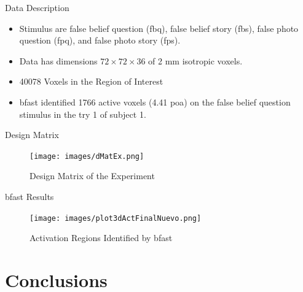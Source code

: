 \documentclass{beamer}
\begin{document}
\begin{frame}{Data Description}
\begin{itemize}
\item Stimulus are false belief question (fbq), false belief
story (fbs), false photo question (fpq), and false photo story (fps).
\item Data has dimensions $72\times72\times36$ of 2 mm isotropic voxels.
\item 40078 Voxels in the Region of Interest
\item \gls{bfast} identified 1766 active voxels (4.41 \gls{poa}) on the false belief 
question stimulus in the try 1 of subject 1.
\end{itemize}
\end{frame}

\begin{frame}{Design Matrix}
\begin{figure}
\centering
\texttt{[image: images/dMatEx.png]}
\caption{Design Matrix of the Experiment}
\end{figure}
\end{frame}



\begin{frame}{\gls{bfast} Results}
\begin{figure}
\centering
\texttt{[image: images/plot3dActFinalNuevo.png]}
\caption{Activation Regions Identified by \gls{bfast}}
\end{figure}
\end{frame}

\section{Conclusions}
\end{document}
